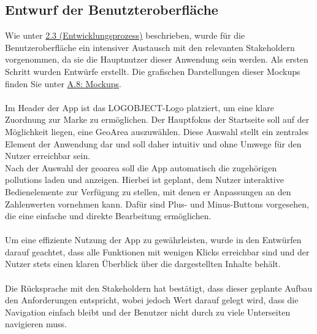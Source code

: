 \documentclass[a4paper,12pt]{article}
\begin{document}
\subsection{Entwurf der Benutzteroberfläche}
Wie unter \hyperref[sec:entwicklungsprozess]{2.3 (Entwicklungsprozess)} beschrieben, wurde für die Benutzeroberfläche ein intensiver Austausch mit den relevanten Stakeholdern vorgenommen, da sie die Hauptnutzer dieser Anwendung sein werden. Als ersten Schritt wurden Entwürfe erstellt. Die grafischen Darstellungen dieser Mockups finden Sie unter \hyperref[sec:mockups]{A.8: Mockups}.\\
\\
Im Header der App ist das \glqq LOGOBJECT\grqq{}-Logo platziert, um eine klare Zuordnung zur Marke zu ermöglichen. Der Hauptfokus der Startseite soll auf der Möglichkeit liegen, eine GeoArea auszuwählen. Diese Auswahl stellt ein zentrales Element der Anwendung dar und soll daher intuitiv und ohne Umwege für den Nutzer erreichbar sein.\\
Nach der Auswahl der \gls{geoarea} soll die App automatisch die zugehörigen \glspl{pollution} laden und anzeigen. Hierbei ist geplant, dem Nutzer interaktive Bedienelemente zur Verfügung zu stellen, mit denen er Anpassungen an den Zahlenwerten vornehmen kann. Dafür sind Plus- und Minus-Buttons vorgesehen, die eine einfache und direkte Bearbeitung ermöglichen.\\
\\
Um eine effiziente Nutzung der App zu gewährleisten, wurde in den Entwürfen darauf geachtet, dass alle Funktionen mit wenigen Klicks erreichbar sind und der Nutzer stets einen klaren Überblick über die dargestellten Inhalte behält.\\
\\
Die Rücksprache mit den Stakeholdern hat bestätigt, dass dieser geplante Aufbau den Anforderungen entspricht, wobei jedoch Wert darauf gelegt wird, dass die Navigation einfach bleibt und der Benutzer nicht durch zu viele Unterseiten navigieren muss.
\end{document}
